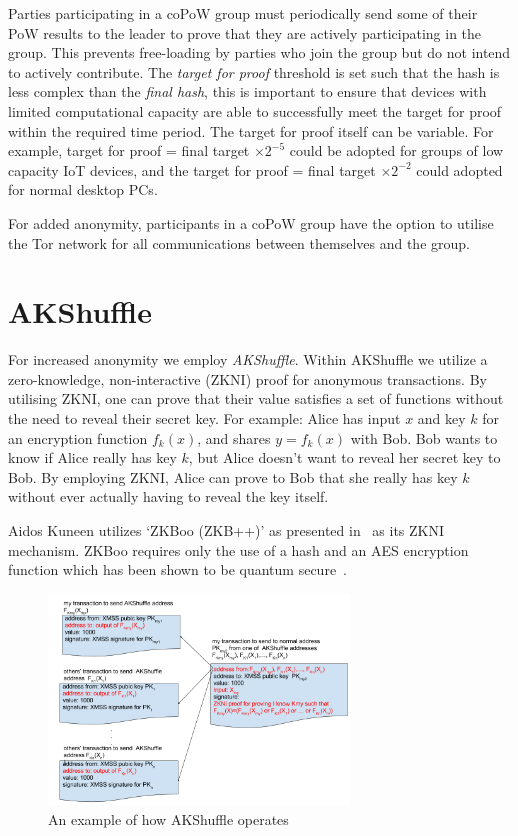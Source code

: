 \documentclass[a4paper,10pt,twocolumn]{article}
\begin{document}
	Parties participating in a coPoW group must periodically send some of their PoW results to the leader to prove 
	that they are actively participating in the group. This prevents free-loading by parties who join the group but do not intend to 
	actively contribute. The \emph{target for proof} threshold is set such that the hash is less complex than the \emph{final hash},
	this is important to ensure that devices with limited computational capacity are able to successfully meet the 
	target for proof within the required time period. The target for proof itself can be variable. For example, target for proof = final 
	target \(  \times 2^{-5} \) could be adopted for groups of low capacity IoT devices, and the target for proof = final target  \( \times 
	2^{-2} \) could adopted for normal desktop PCs.
	
	\vspace{2.5mm}
	
	For added anonymity, participants in a coPoW group have the option to utilise the Tor network for all communications between themselves 
	and the group. 
	
	\section{AKShuffle}
	\label{sec:aks}
	
	For increased anonymity we employ \emph{AKShuffle}. Within AKShuffle we utilize a zero-knowledge, non-interactive (ZKNI) proof for
	anonymous transactions. By utilising ZKNI, one can prove that their value satisfies a set of functions without the need to reveal their 
	secret key. For example: Alice has input \(x\) and key \( k \) for an encryption function \( f_{k}(x) \), and shares \( y=f_k(x) \) 
	with Bob. Bob wants to know if Alice really has key \(k\), but Alice doesn't want to reveal her secret key to Bob. By employing ZKNI, 
	Alice can prove to Bob that she really has key \( k\) without ever actually having to reveal the key itself.
	
	\vspace{2.5mm}
	
	Aidos Kuneen utilizes `ZKBoo (ZKB++)' as presented in~\cite{zkb} as its ZKNI mechanism. ZKBoo requires only the use of a hash and an 
	AES encryption function which has been shown to be quantum secure~\cite{pqcrypto}.
	
	\begin{figure}[ht]
		\begin{center}
		\includegraphics[width=80mm]{shuffle.png}
		  \caption{An example of how AKShuffle operates}
		\label{fig:shuffle}
		\end{center}
	 \end{figure}
	
\end{document}
